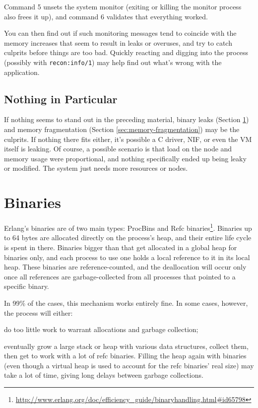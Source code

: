\documentclass[11pt, oneside]{book}   	%
\newcommand{\function}[1]{\Verb`#1`}
\begin{document}
Command 5 unsets the system monitor (exiting or killing the monitor process also frees it up), and command 6 validates that everything worked.

You can then find out if such monitoring messages tend to coincide with the memory increases that seem to result in leaks or overuses, and try to catch culprits before things are too bad. Quickly reacting and digging into the process (possibly with \function{recon:info/1}) may help find out what's wrong with the application.

\subsection{Nothing in Particular}

If nothing seems to stand out in the preceding material, binary leaks (Section \ref{sec:binaries}) and memory fragmentation (Section \ref{sec:memory-fragmentation}) may be the culprits. If nothing there fits either, it's possible a C driver, NIF, or even the VM itself is leaking. Of course, a possible scenario is that load on the node and memory usage were proportional, and nothing specifically ended up being leaky or modified. The system just needs more resources or nodes.

\section{Binaries}
\label{sec:binaries}

Erlang's binaries are of two main types: ProcBins and Refc binaries\footnote{\href{http://www.erlang.org/doc/efficiency\_guide/binaryhandling.html\#id65798}{http://www.erlang.org/doc/efficiency\_guide/binaryhandling.html\#id65798}}. Binaries up to 64 bytes are allocated directly on the process's heap, and their entire life cycle is spent in there. Binaries bigger than that get allocated in a global heap for binaries only, and each process to use one holds a local reference to it in its local heap. These binaries are reference-counted, and the deallocation will occur only once all references are garbage-collected from all processes that pointed to a specific binary.

In 99\% of the cases, this mechanism works entirely fine. In some cases, however, the process will either:

\begin{enumerate*}
	\item do too little work to warrant allocations and garbage collection;
         \item eventually grow a large stack or heap with various data structures, collect them, then get to work with a lot of refc binaries. Filling the heap again with binaries (even though a virtual heap is used to account for the refc binaries' real size) may take a lot of time, giving long delays between garbage collections.
\end{enumerate*}
\end{document}
